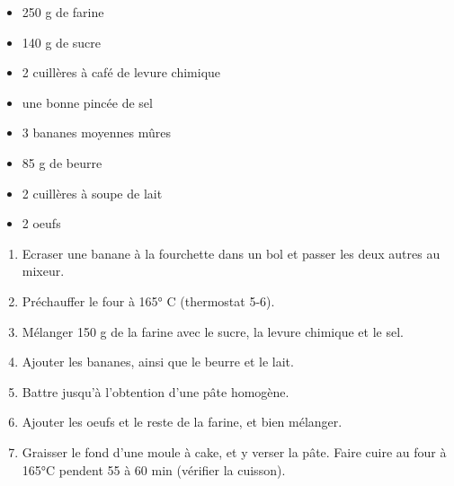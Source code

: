 {}{\begin{itemize}
	\item 250 g de farine
	\item 140 g de sucre
	\item 2 cuillères à café de levure chimique
	\item une bonne pincée de sel
	\item 3 bananes moyennes mûres
	\item 85 g de beurre
	\item 2 cuillères à soupe de lait
	\item 2 oeufs
\end{itemize}}
{\phantom{.}

\medskip
\begin{enumerate}
	\item Ecraser une banane à la fourchette dans un bol et passer les deux autres au mixeur.
	\item Préchauffer le four à 165° C (thermostat 5-6).
	\item Mélanger 150 g de la farine avec le sucre, la levure chimique et le sel.
	\item Ajouter les bananes, ainsi que le beurre et le lait.
	\item Battre jusqu'à l'obtention d'une pâte homogène.
	\item Ajouter les oeufs et le reste de la farine, et bien mélanger.
	\item Graisser le fond d'une moule à cake, et y verser la pâte. Faire cuire au four à 165°C pendent 55 à 60 min (vérifier la cuisson).
\end{enumerate}

\medskip
\phantom{.}}

